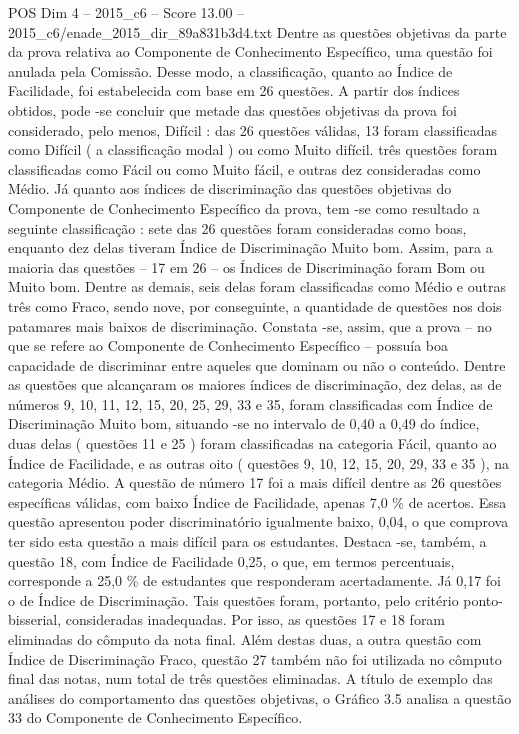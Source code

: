\begin{textsample}{POS Dim 4 – 2015\_c6 – Score 13.00 – 2015\_c6/enade\_2015\_dir\_89a831b3d4.txt}
Dentre as questões objetivas da parte da prova relativa ao Componente de Conhecimento Específico, uma questão foi anulada pela Comissão.
Desse modo, a classificação, quanto ao Índice de Facilidade, foi estabelecida com base em 26 questões.
A partir dos índices obtidos, pode -se concluir que metade das questões objetivas da prova foi considerado, pelo menos, Difícil : das 26 questões válidas, 13 foram classificadas como Difícil ( a classificação modal ) ou como Muito difícil. três questões foram classificadas como Fácil ou como Muito fácil, e outras dez consideradas como Médio.
Já quanto aos índices de discriminação das questões objetivas do Componente de Conhecimento Específico da prova, tem -se como resultado a seguinte classificação : sete das 26 questões foram consideradas como boas, enquanto dez delas tiveram Índice de Discriminação Muito bom.
Assim, para a maioria das questões – 17 em 26 – os Índices de Discriminação foram Bom ou Muito bom.
Dentre as demais, seis delas foram classificadas como Médio e outras três como Fraco, sendo nove, por conseguinte, a quantidade de questões nos dois patamares mais baixos de discriminação.
Constata -se, assim, que a prova – no que se refere ao Componente de Conhecimento Específico – possuía boa capacidade de discriminar entre aqueles que dominam ou não o conteúdo.
Dentre as questões que alcançaram os maiores índices de discriminação, dez delas, as de números 9, 10, 11, 12, 15, 20, 25, 29, 33 e 35, foram classificadas com Índice de Discriminação Muito bom, situando -se no intervalo de 0,40 a 0,49 do índice, duas delas ( questões 11 e 25 ) foram classificadas na categoria Fácil, quanto ao Índice de Facilidade, e as outras oito ( questões 9, 10, 12, 15, 20, 29, 33 e 35 ), na categoria Médio.
A questão de número 17 foi a mais difícil dentre as 26 questões específicas válidas, com baixo Índice de Facilidade, apenas 7,0 \% de acertos.
Essa questão apresentou poder discriminatório igualmente baixo, 0,04, o que comprova ter sido esta questão a mais difícil para os estudantes.
Destaca -se, também, a questão 18, com Índice de Facilidade 0,25, o que, em termos percentuais, corresponde a 25,0 \% de estudantes que responderam acertadamente.
Já 0,17 foi o de Índice de Discriminação.
Tais questões foram, portanto, pelo critério ponto-bisserial, consideradas inadequadas.
Por isso, as questões 17 e 18 foram eliminadas do cômputo da nota final.
Além destas duas, a outra questão com Índice de Discriminação Fraco, questão 27 também não foi utilizada no cômputo final das notas, num total de três questões eliminadas.
A título de exemplo das análises do comportamento das questões objetivas, o Gráfico 3.5 analisa a questão 33 do Componente de Conhecimento Específico.

\end{textsample}

